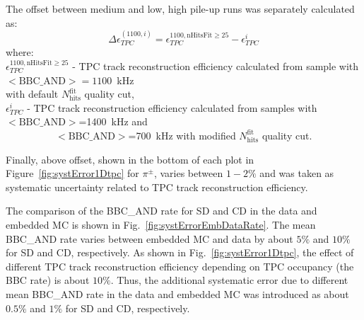 The offset between medium and low, high pile-up runs was separately calculated as:
\begin{equation}
\Delta\epsilon_{ TPC}^{(1100,i)} = \epsilon_{ TPC}^{1100, \text{nHitsFit}\geq 25}-\epsilon_{ TPC}^{i}
\label{eq:tpcSystDifference}
\end{equation}
where:\\[5pt]
$\epsilon_{ TPC}^{1100, \text{nHitsFit}\geq 25}$ - TPC track reconstruction efficiency calculated from sample with \mbox{$<\text{BBC\_AND}>=1100$~kHz}\\\hspace*{70pt}with default $N_{\text{hits}}^{\text{fit}}$ quality cut,\\
$\epsilon_{ TPC}^{i}$ - TPC track reconstruction efficiency calculated from  samples with  \mbox{$<\text{BBC\_AND}>$=1400~kHz} and \\\mbox{~~~~~~~~~~$<\text{BBC\_AND}>$=700~kHz}  with modified $N_{\text{hits}}^{\text{fit}}$ quality cut.

Finally, above offset, shown in  the bottom of each plot in Figure~\ref{fig:systError1Dtpc}  for $\pi^\pm$, varies between $1-2\%$ and was taken as systematic uncertainty related to TPC track reconstruction efficiency.





The comparison of the BBC\_AND rate for SD and CD in the data and embedded MC is shown in Fig.~\ref{fig:systErrorEmbDataRate}. The mean BBC\_AND rate varies between embedded MC and data by about  $5\%$ and $10\%$ for SD and CD, respectively. As shown in Fig.~\ref{fig:systError1Dtpc}, the effect of different TPC track reconstruction efficiency depending on TPC occupancy (the BBC rate) is about $10\%$.  Thus, the additional systematic error due to different mean BBC\_AND rate in the data and embedded MC was introduced as about $0.5\%$ and $1\%$ for SD and CD, respectively.
	
